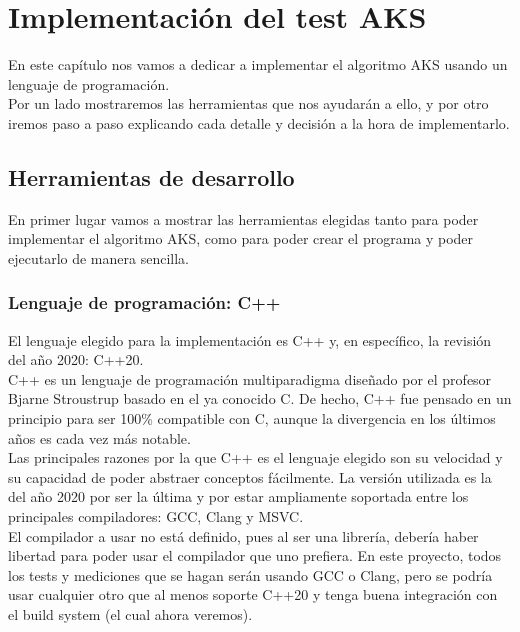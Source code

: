 \chapter{Implementación del test AKS}

En este capítulo nos vamos a dedicar a implementar el algoritmo AKS usando un lenguaje de programación.\\

Por un lado mostraremos las herramientas que nos ayudarán a ello, y por otro iremos paso a paso explicando cada detalle y decisión a la hora de implementarlo.

\section{Herramientas de desarrollo}

En primer lugar vamos a mostrar las herramientas elegidas tanto para poder implementar el algoritmo AKS, como para poder crear el programa y poder ejecutarlo de manera sencilla.\\

\subsection{Lenguaje de programación: C++}

El lenguaje elegido para la implementación es C++ y, en específico, la revisión del año 2020: C++20.\\

C++ es un lenguaje de programación multiparadigma diseñado por el profesor Bjarne Stroustrup \cite{bjarne_stroustrup} basado en el ya conocido C. De hecho, C++ fue pensado en un principio para ser 100\% compatible con C, aunque la divergencia en los últimos años es cada vez más notable.\\

Las principales razones por la que C++ es el lenguaje elegido son su velocidad y su capacidad de poder abstraer conceptos fácilmente. La versión utilizada es la del año 2020 por ser la última y por estar ampliamente soportada entre los principales compiladores: GCC, Clang y MSVC.\\

El compilador a usar no está definido, pues al ser una librería, debería haber libertad para poder usar el compilador que uno prefiera. En este proyecto, todos los tests y mediciones que se hagan serán usando GCC o Clang, pero se podría usar cualquier otro que al menos soporte C++20 y tenga buena integración con el build system (el cual ahora veremos).

